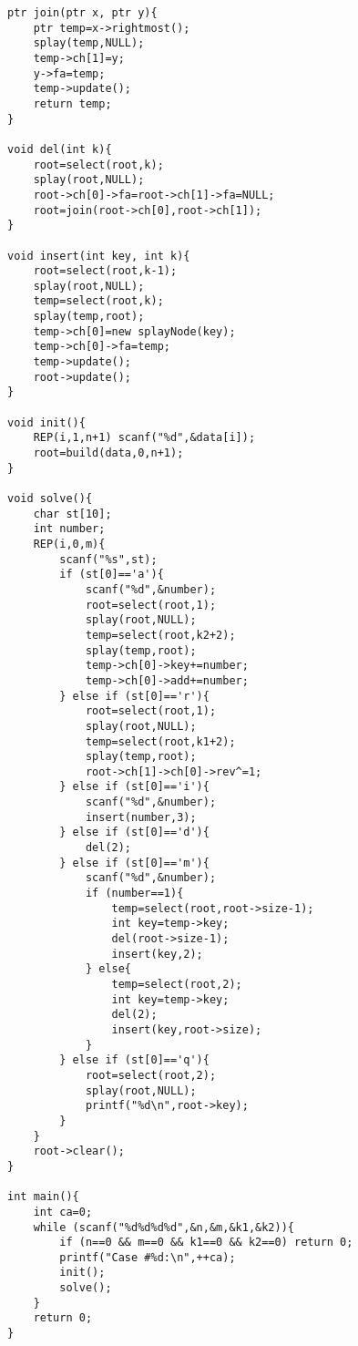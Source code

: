 \begin{verbatim}
ptr join(ptr x, ptr y){
    ptr temp=x->rightmost();
    splay(temp,NULL);
    temp->ch[1]=y;
    y->fa=temp;
    temp->update();
    return temp;
}

void del(int k){
    root=select(root,k);
    splay(root,NULL);
    root->ch[0]->fa=root->ch[1]->fa=NULL;
    root=join(root->ch[0],root->ch[1]);
}

void insert(int key, int k){
    root=select(root,k-1);
    splay(root,NULL);
    temp=select(root,k);
    splay(temp,root);
    temp->ch[0]=new splayNode(key);
    temp->ch[0]->fa=temp;
    temp->update();
    root->update();
}

void init(){
    REP(i,1,n+1) scanf("%d",&data[i]);
    root=build(data,0,n+1);
}

void solve(){
    char st[10];
    int number;
    REP(i,0,m){
        scanf("%s",st);
        if (st[0]=='a'){
            scanf("%d",&number);
            root=select(root,1);
            splay(root,NULL);
            temp=select(root,k2+2);
            splay(temp,root);
            temp->ch[0]->key+=number;
            temp->ch[0]->add+=number;
        } else if (st[0]=='r'){
            root=select(root,1);
            splay(root,NULL);
            temp=select(root,k1+2);
            splay(temp,root);
            root->ch[1]->ch[0]->rev^=1;
        } else if (st[0]=='i'){
            scanf("%d",&number);
            insert(number,3);
        } else if (st[0]=='d'){
            del(2);
        } else if (st[0]=='m'){
            scanf("%d",&number);
            if (number==1){
                temp=select(root,root->size-1);
                int key=temp->key;
                del(root->size-1);
                insert(key,2);
            } else{
                temp=select(root,2);
                int key=temp->key;
                del(2);
                insert(key,root->size);
            }
        } else if (st[0]=='q'){
            root=select(root,2);
            splay(root,NULL);
            printf("%d\n",root->key);
        }
    }
    root->clear();
}

int main(){
    int ca=0;
    while (scanf("%d%d%d%d",&n,&m,&k1,&k2)){
        if (n==0 && m==0 && k1==0 && k2==0) return 0;
        printf("Case #%d:\n",++ca);
        init();
        solve();
    }
    return 0;
}
\end{verbatim}
